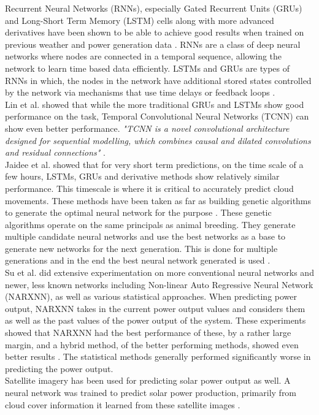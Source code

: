 Recurrent Neural Networks (RNNs), especially Gated Recurrent Units (GRUs) and Long-Short Term Memory (LSTM) cells \cite{Goodfellow-et-al-2016} along with more advanced derivatives have been shown to be able to achieve good results when trained on previous weather and power generation data \cite{lin_temporal_2020, lee_forecasting_2018, jaidee_very_2019, su_machine_2019}.
RNNs are a class of deep neural networks where nodes are connected in a temporal sequence, allowing the network to learn time based data efficiently. LSTMs and GRUs are types of RNNs in which, the nodes in the network have additional stored states controlled by the network via mechanisms that use time delays or feedback loops \cite{Goodfellow-et-al-2016, noauthor_recurrent_2021}.\\
Lin et al. \cite{lin_temporal_2020} showed that while the more traditional GRUs and LSTMs show good performance on the task, Temporal Convolutional Neural Networks (TCNN) can show even better performance. \textit{"TCNN is a novel convolutional architecture designed for sequential modelling, which combines causal and dilated convolutions
and residual connections"} \cite{lin_temporal_2020}. \\
Jaidee et al. \cite{jaidee_very_2019} showed that for very short term predictions, on the time scale of a few hours, LSTMs, GRUs and derivative methods show relatively similar performance. This timescale is where it is critical to accurately predict cloud movements. 
These methods have been taken as far as building genetic algorithms to generate the optimal neural network for the purpose \cite{jaidee_very_2019}. These genetic algorithms operate on the same principals as animal breeding. They generate multiple candidate neural networks and use the best networks as a base to generate new networks for the next generation. This is done for multiple generations and in the end the best neural network generated is used \cite{jaidee_very_2019}.\\
Su et al. \cite{su_machine_2019} did extensive experimentation on more conventional neural networks and newer, less known networks including  Non-linear Auto Regressive Neural Network (NARXNN), as well as various statistical approaches. When predicting power output, NARXNN takes in the current power output values and considers them as well as the past values of the power output of the system. These experiments showed that NARXNN had the best performance of these, by a rather large margin, and a hybrid method, of the better performing methods, showed even better results \cite{anderson_using_2018}. The statistical methods generally performed significantly worse in predicting the power output. \\
Satellite imagery has been used for predicting solar power output as well. A neural network was trained to predict solar power production, primarily from cloud cover information it learned from these satellite images \cite{jang_solar_2016}.\\



